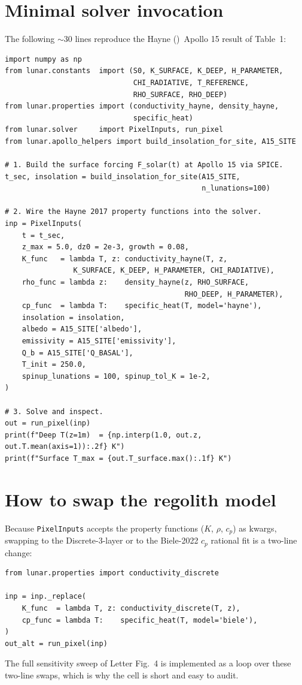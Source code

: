 \documentclass[11pt]{report}
\newcommand{\Hayne}{Hayne (\citeyear{hayne2017})}
\begin{document}
\section{Minimal solver invocation}
The following $\sim\!30$ lines reproduce the \Hayne\ Apollo 15 result
of Table~1:
\begin{lstlisting}[caption={Minimal Apollo 15 \Hayne\ run.},
                   label={lst:minimal}]
import numpy as np
from lunar.constants  import (S0, K_SURFACE, K_DEEP, H_PARAMETER,
                              CHI_RADIATIVE, T_REFERENCE,
                              RHO_SURFACE, RHO_DEEP)
from lunar.properties import (conductivity_hayne, density_hayne,
                              specific_heat)
from lunar.solver     import PixelInputs, run_pixel
from lunar.apollo_helpers import build_insolation_for_site, A15_SITE

# 1. Build the surface forcing F_solar(t) at Apollo 15 via SPICE.
t_sec, insolation = build_insolation_for_site(A15_SITE,
                                              n_lunations=100)

# 2. Wire the Hayne 2017 property functions into the solver.
inp = PixelInputs(
    t = t_sec,
    z_max = 5.0, dz0 = 2e-3, growth = 0.08,
    K_func   = lambda T, z: conductivity_hayne(T, z,
                K_SURFACE, K_DEEP, H_PARAMETER, CHI_RADIATIVE),
    rho_func = lambda z:    density_hayne(z, RHO_SURFACE,
                                          RHO_DEEP, H_PARAMETER),
    cp_func  = lambda T:    specific_heat(T, model='hayne'),
    insolation = insolation,
    albedo = A15_SITE['albedo'],
    emissivity = A15_SITE['emissivity'],
    Q_b = A15_SITE['Q_BASAL'],
    T_init = 250.0,
    spinup_lunations = 100, spinup_tol_K = 1e-2,
)

# 3. Solve and inspect.
out = run_pixel(inp)
print(f"Deep T(z=1m)  = {np.interp(1.0, out.z, out.T.mean(axis=1)):.2f} K")
print(f"Surface T_max = {out.T_surface.max():.1f} K")
\end{lstlisting}

\section{How to swap the regolith model}
Because \texttt{PixelInputs} accepts the property functions
($K$, $\rho$, $c_p$) as kwargs, swapping to the Discrete-3-layer or
to the Biele-2022 $c_p$ rational fit is a two-line change:
\begin{lstlisting}[caption={Discrete 3-layer + Biele $c_p$ swap.}]
from lunar.properties import conductivity_discrete

inp = inp._replace(
    K_func  = lambda T, z: conductivity_discrete(T, z),
    cp_func = lambda T:    specific_heat(T, model='biele'),
)
out_alt = run_pixel(inp)
\end{lstlisting}
The full sensitivity sweep of Letter Fig.~4 is implemented as a loop
over these two-line swaps, which is why the cell is short and easy
to audit.
\end{document}
